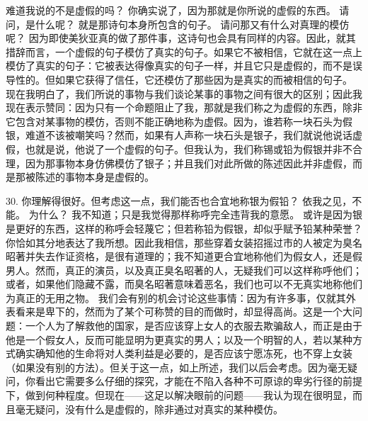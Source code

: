 \par

难道我说的不是虚假的吗？ 你确实说了，因为那就是你所说的虚假的东西。 请问，是什么呢？ 就是那诗句本身所包含的句子。 请问那又有什么对真理的模仿呢？ 因为即使美狄亚真的做了那件事，这诗句也会具有同样的内容。因此，就其措辞而言，一个虚假的句子模仿了真实的句子。如果它不被相信，它就在这一点上模仿了真实的句子：它被表达得像真实的句子一样，并且它只是虚假的，而不是误导性的。但如果它获得了信任，它还模仿了那些因为是真实的而被相信的句子。 现在我明白了，我们所说的事物与我们谈论某事的事物之间有很大的区别；因此我现在表示赞同：因为只有一个命题阻止了我，那就是我们称之为虚假的东西，除非它包含对某事物的模仿，否则不能正确地称为虚假。因为，谁若称一块石头为假银，难道不该被嘲笑吗？然而，如果有人声称一块石头是银子，我们就说他说话虚假，也就是说，他说了一个虚假的句子。但我认为，我们称锡或铅为假银并非不合理，因为那事物本身仿佛模仿了银子；并且我们对此所做的陈述因此并非虚假，而是那被陈述的事物本身是虚假的。\par

30.  你理解得很好。但考虑这一点，我们能否也合宜地称银为假铅？ 依我之见，不能。 为什么？ 我不知道；只是我觉得那样称呼完全违背我的意愿。 或许是因为银是更好的东西，这样的称呼会轻蔑它；但若称铅为假银，却似乎赋予铅某种荣誉？ 你恰如其分地表达了我所想。因此我相信，那些穿着女装招摇过市的人被定为臭名昭著并失去作证资格，是很有道理的；我不知道更合宜地称他们为假女人，还是假男人。然而，真正的演员，以及真正臭名昭著的人，无疑我们可以这样称呼他们；或者，如果他们隐藏不露，而臭名昭著意味着恶名，我们也可以不无真实地称他们为真正的无用之物。 我们会有别的机会讨论这些事情：因为有许多事，仅就其外表看来是卑下的，然而为了某个可称赞的目的而做时，却显得高尚。这是一个大问题：一个人为了解救他的国家，是否应该穿上女人的衣服去欺骗敌人，而正是由于他是一个假女人，反而可能显明为更真实的男人；以及一个明智的人，若以某种方式确实确知他的生命将对人类利益是必要的，是否应该宁愿冻死，也不穿上女装（如果没有别的方法）。但关于这一点，如上所述，我们以后会考虑。因为毫无疑问，你看出它需要多么仔细的探究，才能在不陷入各种不可原谅的卑劣行径的前提下，做到何种程度。但现在——这足以解决眼前的问题——我认为现在很明显，而且毫无疑问，没有什么是虚假的，除非通过对真实的某种模仿。\par

